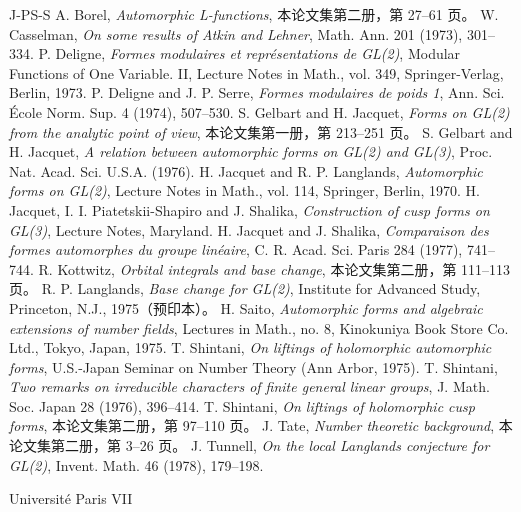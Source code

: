\begin{thebibliography}{J-PS-S}
 A. Borel, \emph{Automorphic L-functions}, 本论文集第二册，第 27--61 页。
 W. Casselman, \emph{On some results of Atkin and Lehner}, Math. Ann. 201 (1973), 301--334.
 P. Deligne, \emph{Formes modulaires et représentations de GL(2)}, Modular Functions of One Variable. II, Lecture Notes in Math., vol. 349, Springer-Verlag, Berlin, 1973.
 P. Deligne and J. P. Serre, \emph{Formes modulaires de poids 1}, Ann. Sci. École Norm. Sup. 4 (1974), 507--530.
 S. Gelbart and H. Jacquet, \emph{Forms on GL(2) from the analytic point of view}, 本论文集第一册，第 213--251 页。
 S. Gelbart and H. Jacquet, \emph{A relation between automorphic forms on GL(2) and GL(3)}, Proc. Nat. Acad. Sci. U.S.A. (1976).
 H. Jacquet and R. P. Langlands, \emph{Automorphic forms on GL(2)}, Lecture Notes in Math., vol. 114, Springer, Berlin, 1970.
 H. Jacquet, I. I. Piatetskii-Shapiro and J. Shalika, \emph{Construction of cusp forms on GL(3)}, Lecture Notes, Maryland.
 H. Jacquet and J. Shalika, \emph{Comparaison des formes automorphes du groupe linéaire}, C. R. Acad. Sci. Paris 284 (1977), 741--744.
 R. Kottwitz, \emph{Orbital integrals and base change}, 本论文集第二册，第 111--113 页。
 R. P. Langlands, \emph{Base change for GL(2)}, Institute for Advanced Study, Princeton, N.J., 1975（预印本）。
 H. Saito, \emph{Automorphic forms and algebraic extensions of number fields}, Lectures in Math., no. 8, Kinokuniya Book Store Co. Ltd., Tokyo, Japan, 1975.
 T. Shintani, \emph{On liftings of holomorphic automorphic forms}, U.S.-Japan Seminar on Number Theory (Ann Arbor, 1975).
 T. Shintani, \emph{Two remarks on irreducible characters of finite general linear groups}, J. Math. Soc. Japan 28 (1976), 396--414.
 T. Shintani, \emph{On liftings of holomorphic cusp forms}, 本论文集第二册，第 97--110 页。
 J. Tate, \emph{Number theoretic background}, 本论文集第二册，第 3--26 页。
 J. Tunnell, \emph{On the local Langlands conjecture for GL(2)}, Invent. Math. 46 (1978), 179--198.
\end{thebibliography}
\begin{flushleft}\small Université Paris VII\end{flushleft}
